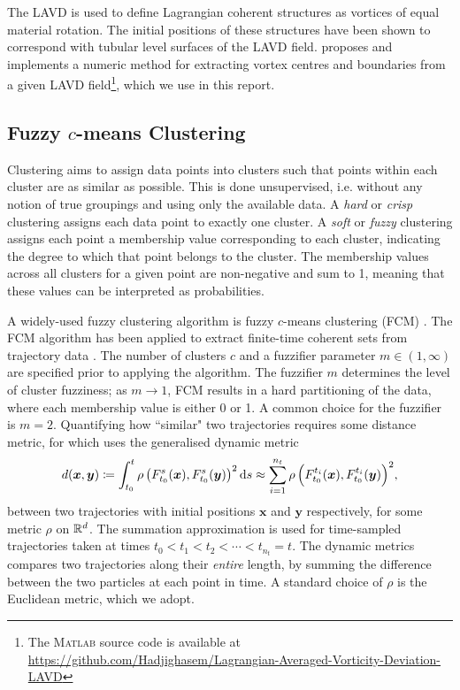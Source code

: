 \documentclass[a4paper, fontsize=12pt]{article}
\begin{document}
\begin{enumerate}
The LAVD is used to define Lagrangian coherent structures as vortices of equal material rotation. The initial positions of these structures have been shown to correspond with tubular level surfaces of the LAVD field. \cite{haller_2016_lavd} proposes and implements a numeric method for extracting vortex centres and boundaries from a given LAVD field\footnote{The \textsc{Matlab} source code is available at \url{https://github.com/Hadjighasem/Lagrangian-Averaged-Vorticity-Deviation-LAVD}}, which we use in this report. 
\end{enumerate}






\subsection{Fuzzy \(c\)-means Clustering}%
Clustering aims to assign data points into clusters such that points within each cluster are as similar as possible. This is done unsupervised, i.e. without any notion of true groupings and using only the available data. A \textit{hard} or \textit{crisp} clustering assigns each data point to exactly one cluster. A \textit{soft} or \textit{fuzzy} clustering assigns each point a membership value corresponding to each cluster, indicating the degree to which that point belongs to the cluster. The membership values across all clusters for a given point are non-negative and sum to 1, meaning that these values can be interpreted as probabilities.

A widely-used fuzzy clustering algorithm is fuzzy \(c\)-means clustering (FCM) \citep{dunn_1973_fcm,bezdek_1981_fcm}. The FCM algorithm has been applied to extract finite-time coherent sets from trajectory data \citep{froyland_2015_fuzzy}. The number of clusters \(c\) and a fuzzifier parameter \(m \in (1,\infty)\) are specified prior to applying the algorithm. The fuzzifier \(m\) determines the level of cluster fuzziness; as \(m \to 1\), FCM results in a hard partitioning of the data, where each membership value is either 0 or 1. A common choice for the fuzzifier is \(m = 2\). Quantifying how ``similar" two trajectories requires some distance metric, for which \cite{froyland_2015_fuzzy} uses the generalised dynamic metric
\begin{equation}
d(\bm{x},\bm{y}) \coloneqq \int_{t_0}^{t}{\rho\left(F_{t_0}^{s}(\bm{x}), F_{t_0}^{s}(\bm{y})\right)^2\dif s} \approx \sum_{i=1}^{n_t}{\rho\left(F_{t_0}^{t_i}(\bm{x}), F_{t_0}^{t_i}(\bm{y})\right)^2},
\label{eqn:dynmet}
\end{equation}
between two trajectories with initial positions \(\bm{x}\) and \(\bm{y}\) respectively, for some metric \(\rho\) on \(\mathbb{R}^d\). The summation approximation is used for time-sampled trajectories taken at times \(t_0 < t_1 < t_2 < \cdots < t_{n_t} = t\). The dynamic metrics compares two trajectories along their \textit{entire} length, by summing the difference between the two particles at each point in time. A standard choice of \(\rho\) is the Euclidean metric, which we adopt.
\end{document}
